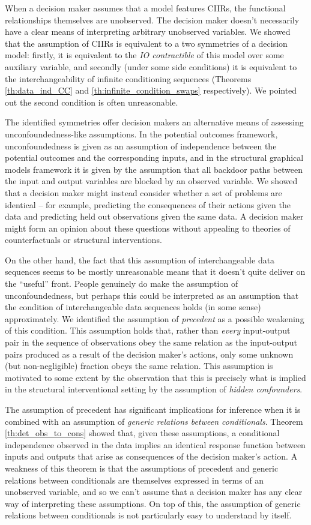 When a decision maker assumes that a model features CIIRs, the functional relationships themselves are unobserved. The decision maker doesn't necessarily have a clear means of interpreting arbitrary unobserved variables. We showed that the assumption of CIIRs is equivalent to a two symmetries of a decision model: firstly, it is equivalent to the \emph{IO contractible} of this model over some auxiliary variable, and secondly (under some side conditions) it is equivalent to the interchangeability of infinite conditioning sequences (Theorems \ref{th:data_ind_CC} and \ref{th:infinite_condition_swaps} respectively). We pointed out the second condition is often unreasonable.

The identified symmetries offer decision makers an alternative means of assessing unconfoundedness-like assumptions. In the potential outcomes framework, unconfoundedness is given as an assumption of independence between the potential outcomes and the corresponding inputs, and in the structural graphical models framework it is given by the assumption that all backdoor paths between the input and output variables are blocked by an observed variable. We showed that a decision maker might instead consider whether a set of problems are identical -- for example, predicting the consequences of their actions given the data and predicting held out observations given the same data. A decision maker might form an opinion about these questions without appealing to theories of counterfactuals or structural interventions.

On the other hand, the fact that this assumption of interchangeable data sequences seems to be mostly unreasonable means that it doesn't quite deliver on the ``useful'' front. People genuinely do make the assumption of unconfoundedness, but perhaps this could be interpreted as an assumption that the condition of interchangeable data sequences holds (in some sense) approximately. We identified the assumption of \emph{precedent} as a possible weakening of this condition. This assumption holds that, rather than \emph{every} input-output pair in the sequence of observations obey the same relation as the input-output pairs produced as a result of the decision maker's actions, only some unknown (but non-negligible) fraction obeys the same relation. This assumption is motivated to some extent by the observation that this is precisely what is implied in the structural interventional setting by the assumption of \emph{hidden confounders}.

The assumption of precedent has significant implications for inference when it is combined with an assumption of \emph{generic relations between conditionals}. Theorem \ref{th:det_obs_to_cons} showed that, given these assumptions, a conditional independence observed in the data implies an identical response function between inputs and outputs that arise as consequences of the decision maker's action. A weakness of this theorem is that the assumptions of precedent and generic relations between conditionals are themselves expressed in terms of an unobserved variable, and so we can't assume that a decision maker has any clear way of interpreting these assumptions. On top of this, the assumption of generic relations between conditionals is not particularly easy to understand by itself.

